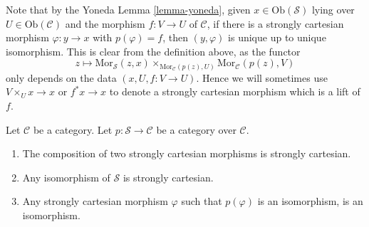 \noindent
Note that by the Yoneda Lemma \ref{lemma-yoneda}, given
$x \in \text{Ob}(\mathcal{S})$ lying over $U \in \text{Ob}(\mathcal{C})$
and the morphism $f : V \to U$ of $\mathcal{C}$, if there is a
strongly cartesian morphism $\varphi : y \to x$ with $p(\varphi) = f$,
then $(y, \varphi)$ is unique up to unique isomorphism. This is
clear from the definition above, as the functor
$$
z
\longmapsto
\text{Mor}_{\mathcal{S}}(z, x)
\times_{\text{Mor}_{\mathcal{C}}(p(z), U)}
\text{Mor}_{\mathcal{C}}(p(z), V)
$$
only depends on the data $(x, U, f : V \to U)$. Hence we
will sometimes use $V \times_U x \to x$ or $f^*x \to x$
to denote a strongly cartesian morphism which is a lift of $f$.

\begin{lemma}
\label{lemma-composition-cartesian}
Let $\mathcal{C}$ be a category.
Let $p : \mathcal{S} \to \mathcal{C}$ be a category over $\mathcal{C}$.
\begin{enumerate}
\item The composition of two strongly cartesian morphisms
is strongly cartesian.
\item Any isomorphism of $\mathcal{S}$ is strongly cartesian.
\item Any strongly cartesian morphism $\varphi$ such that $p(\varphi)$
is an isomorphism, is an isomorphism.
\end{enumerate}
\end{lemma}

